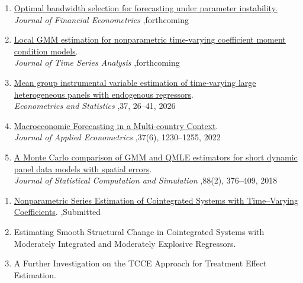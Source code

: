 \documentclass[letterpaper,10pt]{article}
\begin{document}
\begin{enumerate}
  \item  \href{https://doi.org/10.1093/jjfinec/nbag001}
         {Optimal bandwidth selection for forecasting under parameter instability.} \\
         \textit{Journal of Financial Econometrics} \sep forthcoming
  
  \item \href{https://onlinelibrary.wiley.com/doi/10.1111/jtsa.12822}
        {Local GMM estimation for nonparametric time-varying coefficient moment condition models}.\\
        \textit{Journal of Time Series Analysis} \sep forthcoming

  \item \href{https://www.sciencedirect.com/science/article/pii/S2452306223000412}
        {Mean group instrumental variable estimation of time-varying large heterogeneous panels with endogenous regressors}. \\
        \textit{Econometrics and Statistics} \sep 37, 26–41, 2026

  \item \href{https://onlinelibrary.wiley.com/doi/abs/10.1002/jae.2923}
        {Macroeconomic Forecasting in a Multi-country Context}. \\
        \textit{Journal of Applied Econometrics} \sep 37(6), 1230--1255, 2022

  \item \href{https://www.tandfonline.com/doi/abs/10.1080/00949655.2017.1392522}
        {A Monte Carlo comparison of GMM and QMLE estimators for short dynamic panel data models with spatial errors}. \\
        \textit{Journal of Statistical Computation and Simulation} \sep 88(2), 376--409, 2018
\end{enumerate}


\begin{enumerate}
 \item  \href{https://jdluxun1.github.io/papers/paper6/MBS_WP_0926.pdf}{Nonparametric Series Estimation of Cointegrated Systems with Time–Varying Coefficients}.    \sep Submitted


  \item Estimating Smooth Structural Change in Cointegrated Systems with Moderately Integrated and Moderately Explosive Regressors.    
  
  \item A Further Investigation on the TCCE Approach for Treatment Effect Estimation. 
\end{enumerate}
\end{document}
